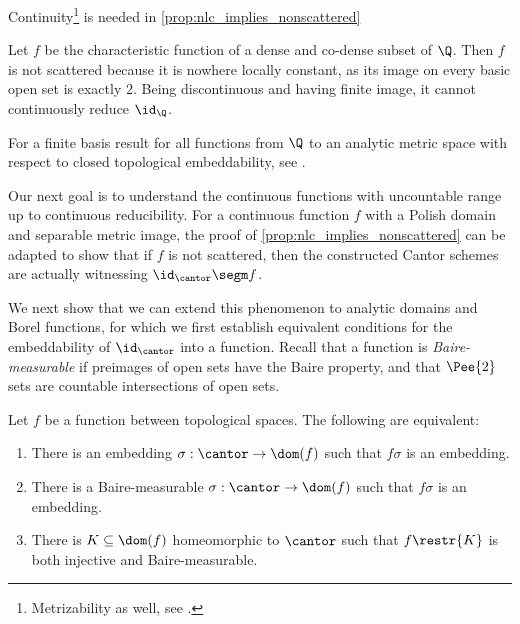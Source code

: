 %

Continuity\footnote{Metrizability as well, see \cite[Footnote of Théorème 2]{MR0107849}.} is needed in \cref{prop:nlc_implies_nonscattered}
\begin{example}\label{counterexamplenonscat}
Let $f$ be the characteristic function of a dense and co-dense subset of $\Q$.
Then $f$ is not scattered because it is nowhere locally constant, as its image on every basic open set is exactly $2$.
Being discontinuous and having finite image, it cannot continuously reduce $\id_\Q$.
\end{example}

For a finite basis result for all functions from $\Q$ to an analytic metric space with respect to closed topological embeddability, see \cite[Theorem 5.5]{carroymiller2}.

\medskip

Our next goal is to understand the continuous functions with uncountable range up to continuous reducibility.
For a continuous function $f$ with a Polish domain and separable metric image, the proof of \cref{prop:nlc_implies_nonscattered} can be adapted to show that if $f$ is not scattered,
then the constructed Cantor schemes are actually witnessing $\id_{\cantor}\segm f$.

We next show that we can extend this phenomenon to analytic domains and Borel functions,
for which we first establish equivalent conditions for the embeddability of $\id_{\cantor}$ into a function.
Recall that a function is \emph{Baire-measurable} if preimages of open sets have the Baire property,
and that $\Pee{2}$ sets are countable intersections of open sets.

\begin{proposition}\label{EquivEmbedCantor}
Let $f$ be a function between topological spaces. The following are equivalent:
\begin{enumerate}
\item There is an embedding $\sigma:\cantor\to\dom(f)$ such that $f\sigma$ is an embedding.
\item There is a Baire-measurable $\sigma:\cantor\to\dom(f)$ such that $f\sigma$ is an embedding.
\item There is $K\subseteq \dom(f)$ homeomorphic to $\cantor$ such that $f\restr{K}$ is both injective and Baire-measurable.
\end{enumerate}
\end{proposition}

